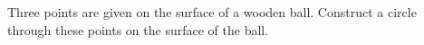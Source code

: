 Three points are given on the surface of a wooden ball. Construct a circle through these points on the surface of the ball.

